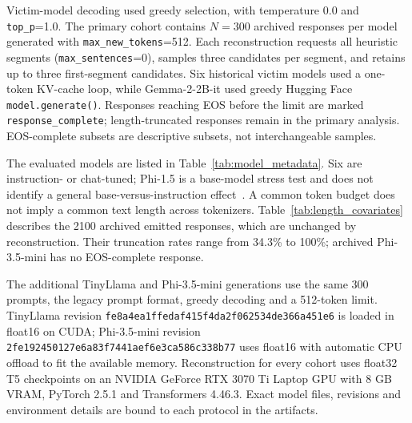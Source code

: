 \documentclass[electronics,article,submit,pdftex,moreauthors]{Definitions/mdpi}
\begin{document}
Victim-model decoding used greedy selection, with temperature 0.0 and \texttt{top\_p}=1.0. The primary cohort contains $N=300$ archived responses per model generated with \texttt{max\_new\_tokens}=512. Each reconstruction requests all heuristic segments (\texttt{max\_sentences}=0), samples three candidates per segment, and retains up to three first-segment candidates. Six historical victim models used a one-token KV-cache loop, while Gemma-2-2B-it used greedy Hugging Face \texttt{model.generate()}. Responses reaching EOS before the limit are marked \texttt{response\_complete}; length-truncated responses remain in the primary analysis. EOS-complete subsets are descriptive subsets, not interchangeable samples.

The evaluated models are listed in Table~\ref{tab:model_metadata}. Six are instruction- or chat-tuned; Phi-1.5 is a base-model stress test and does not identify a general base-versus-instruction effect~\cite{qwen25report,llama3report,llama32blog,gemma2report,phi15report,tinyllama2024,phi3report}. A common token budget does not imply a common text length across tokenizers. Table~\ref{tab:length_covariates} describes the 2100 archived emitted responses, which are unchanged by reconstruction. Their truncation rates range from 34.3\% to 100\%; archived Phi-3.5-mini has no EOS-complete response.

The additional TinyLlama and Phi-3.5-mini generations use the same 300 prompts, the legacy prompt format, greedy decoding and a 512-token limit. TinyLlama revision \texttt{fe8a4ea1ffedaf415f4da2f062534de366a451e6} is loaded in float16 on CUDA; Phi-3.5-mini revision \texttt{2fe192450127e6a83f7441aef6e3ca586c338b77} uses float16 with automatic CPU offload to fit the available memory. Reconstruction for every cohort uses float32 T5 checkpoints on an NVIDIA GeForce RTX 3070 Ti Laptop GPU with 8 GB VRAM, PyTorch 2.5.1 and Transformers 4.46.3. Exact model files, revisions and environment details are bound to each protocol in the artifacts.
\end{document}

